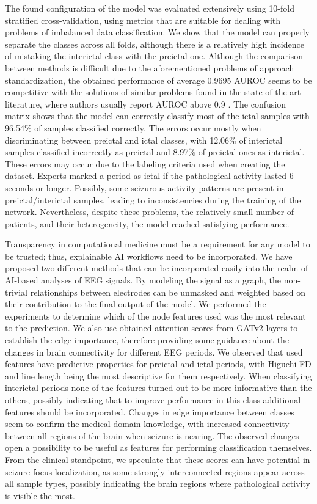 \documentclass[a4paper,fleqn]{cas-sc}
\begin{document}
The found configuration of the model was evaluated extensively using 10-fold stratified cross-validation, using metrics that are suitable for dealing with problems of imbalanced data classification. We show that the model can properly separate the classes across all folds, although there is a relatively high incidence of mistaking the interictal class with the preictal one. Although the comparison between methods is difficult due to the aforementioned problems of approach standardization, the obtained performance of average 0.9695 AUROC seems to be competitive with the solutions of similar problems found in the state-of-the-art literature, where authors usually report AUROC above 0.9 \cite{he2022gatblstm, JiaEfficientGraphConv, ZhaoGraphFocalLoss}. The confusion matrix shows that the model can correctly classify most of the ictal samples with 96.54\% of samples classified correctly. The errors occur mostly when discriminating between preictal and ictal classes, with 12.06\% of interictal samples classified incorrectly as preictal and 8.97\% of preictal ones as interictal. These errors may occur due to the labeling criteria used when creating the dataset. Experts marked a period as ictal if the pathological activity lasted 6 seconds or longer. Possibly, some seizurous activity patterns are present in preictal/interictal samples, leading to inconsistencies during the training of the network. Nevertheless, despite these problems, the relatively small number of patients, and their heterogeneity, the model reached satisfying performance.

Transparency in computational medicine must be a requirement for any model to be trusted; thus, explainable AI workflows need to be incorporated. We have proposed two different methods that can be incorporated easily into the realm of AI-based analyses of EEG signals. By modeling the signal as a graph, the non-trivial relationships between electrodes can be unmasked and weighted based on their contribution to the final output of the model. 
We performed the experiments to determine which of the node features used was the most relevant to the prediction. We also use obtained attention scores from GATv2 layers to establish the edge importance, therefore providing some guidance about the changes in brain connectivity for different EEG periods. We observed that used features have predictive properties for preictal and ictal periods, with Higuchi FD and line length being the most descriptive for them respectively. When classifying interictal periods none of the features turned out to be more informative than the others, possibly indicating that to improve performance in this class additional features should be incorporated.
Changes in edge importance between classes seem to confirm the medical domain knowledge, with increased connectivity between all regions of the brain when seizure is nearing. The observed changes open a possibility to be useful as features for performing classification themselves. From the clinical standpoint, we speculate that these scores can have potential in seizure focus localization, as some strongly interconnected regions appear across all sample types, possibly indicating the brain regions where pathological activity is visible the most.
\end{document}
